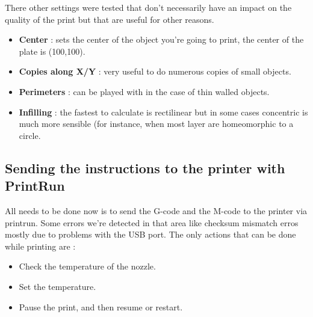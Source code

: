 \documentclass{article}
\begin{document}
There other settings were tested that don't necessarily have an impact on the quality of the print but that are useful for other reasons.
\begin{itemize}
\item \textbf{Center} : sets the center of the object you're going to print, the center of the plate is (100,100).
\item \textbf{Copies along X/Y} : very useful to do numerous copies of small objects.
\item \textbf{Perimeters} : can be played with in the case of thin walled objects.
\item \textbf{Infilling} : the fastest to calculate is rectilinear but in some cases concentric is much more sensible (for instance, when most layer are homeomorphic to a circle.
\end{itemize}

\subsection{Sending the instructions to the printer with PrintRun}
All needs to be done now is to send the G-code and the M-code to the printer via printrun. Some errors we're detected in that area like checksum mismatch erros mostly due to problems with the USB port. The only actions that can be done while printing are :
\begin{itemize}
\item Check the temperature of the nozzle.
\item Set the temperature.
\item Pause the print, and then resume or restart.
\end{itemize}
\end{document}
